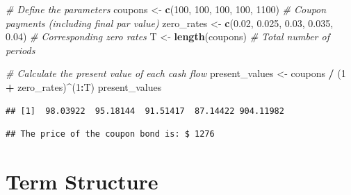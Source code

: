 \documentclass[
]{book}
\newenvironment{Shaded}{\begin{snugshade}}{\end{snugshade}}
\newcommand{\CommentTok}[1]{\textcolor[rgb]{0.56,0.35,0.01}{\textit{#1}}}
\newcommand{\DecValTok}[1]{\textcolor[rgb]{0.00,0.00,0.81}{#1}}
\newcommand{\FloatTok}[1]{\textcolor[rgb]{0.00,0.00,0.81}{#1}}
\newcommand{\FunctionTok}[1]{\textcolor[rgb]{0.13,0.29,0.53}{\textbf{#1}}}
\newcommand{\NormalTok}[1]{#1}
\newcommand{\OtherTok}[1]{\textcolor[rgb]{0.56,0.35,0.01}{#1}}
\newcommand{\SpecialCharTok}[1]{\textcolor[rgb]{0.81,0.36,0.00}{\textbf{#1}}}
\newcommand{\StringTok}[1]{\textcolor[rgb]{0.31,0.60,0.02}{#1}}
\begin{document}
\begin{Shaded}
\begin{Highlighting}[]
\CommentTok{\# Define the parameters}
\NormalTok{coupons    }\OtherTok{\textless{}{-}} \FunctionTok{c}\NormalTok{(}\DecValTok{100}\NormalTok{, }\DecValTok{100}\NormalTok{, }\DecValTok{100}\NormalTok{, }\DecValTok{100}\NormalTok{, }\DecValTok{1100}\NormalTok{)  }\CommentTok{\# Coupon payments (including final par value)}
\NormalTok{zero\_rates }\OtherTok{\textless{}{-}} \FunctionTok{c}\NormalTok{(}\FloatTok{0.02}\NormalTok{, }\FloatTok{0.025}\NormalTok{, }\FloatTok{0.03}\NormalTok{, }\FloatTok{0.035}\NormalTok{, }\FloatTok{0.04}\NormalTok{)  }\CommentTok{\# Corresponding zero rates}
\NormalTok{T }\OtherTok{\textless{}{-}} \FunctionTok{length}\NormalTok{(coupons)  }\CommentTok{\# Total number of periods}

\CommentTok{\# Calculate the present value of each cash flow}
\NormalTok{present\_values }\OtherTok{\textless{}{-}}\NormalTok{ coupons }\SpecialCharTok{/}\NormalTok{ (}\DecValTok{1} \SpecialCharTok{+}\NormalTok{ zero\_rates)}\SpecialCharTok{\^{}}\NormalTok{(}\DecValTok{1}\SpecialCharTok{:}\NormalTok{T)}
\NormalTok{present\_values}
\end{Highlighting}
\end{Shaded}

\begin{verbatim}
## [1]  98.03922  95.18144  91.51417  87.14422 904.11982
\end{verbatim}

\begin{Shaded}
\end{Shaded}

\begin{verbatim}
## The price of the coupon bond is: $ 1276
\end{verbatim}

\hypertarget{term-structure}{%
\section{Term Structure}\label{term-structure}}
\end{document}
